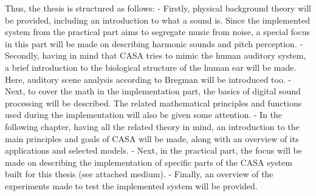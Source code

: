 Thus, the thesis is structured as follows:
-	Firstly, physical background theory will be provided, including an introduction to what a sound is. Since the implemented system from the practical part aims to segregate music from noise, a special focus in this part will be made on describing harmonic sounds and pitch perception.
-	Secondly, having in mind that CASA tries to mimic the human auditory system, a brief introduction to the biological structure of the human ear will be made. Here, auditory scene analysis according to Bregman will be introduced too.
-	Next, to cover the math in the implementation part, the basics of digital sound processing will be described. The related mathematical principles and functions used during the implementation will also be given some attention.
-	In the following chapter, having all the related theory in mind, an introduction to the main principles and goals of CASA will be made, along with an overview of its applications and selected models.
-	Next, in the practical part, the focus will be made on describing the implementation of specific parts of the CASA system built for this thesis (see attached medium).
-	Finally, an overview of the experiments made to test the implemented system will be provided.
